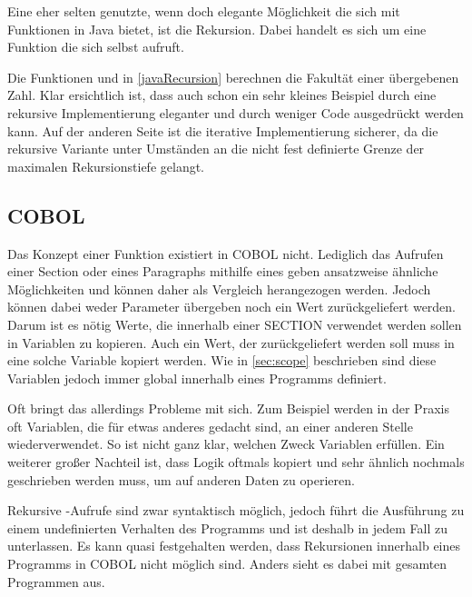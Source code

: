 Eine eher selten genutzte, wenn doch elegante Möglichkeit die sich mit Funktionen in Java bietet, ist die Rekursion. Dabei handelt es sich um eine Funktion die sich selbst aufruft. 


Die Funktionen  und  in \autoref{javaRecursion} berechnen  die Fakultät einer übergebenen Zahl. Klar ersichtlich ist, dass auch schon ein sehr kleines Beispiel durch eine rekursive Implementierung eleganter und durch weniger Code ausgedrückt werden kann. Auf der anderen Seite ist die iterative Implementierung sicherer, da die rekursive Variante unter Umständen an die nicht fest definierte Grenze der maximalen Rekursionstiefe gelangt.

\subsection*{COBOL}
Das Konzept einer Funktion existiert in COBOL nicht. Lediglich das Aufrufen einer Section oder eines Paragraphs mithilfe eines  geben ansatzweise ähnliche Möglichkeiten und können daher als Vergleich herangezogen werden. Jedoch können dabei weder Parameter übergeben noch ein Wert zurückgeliefert werden. Darum ist es nötig Werte, die innerhalb einer SECTION verwendet werden sollen in Variablen zu kopieren. Auch ein Wert, der zurückgeliefert werden soll muss in eine solche Variable kopiert werden. Wie in \autoref{sec:scope} beschrieben sind diese Variablen jedoch immer global innerhalb eines Programms definiert.

Oft bringt das allerdings Probleme mit sich. Zum Beispiel werden in der Praxis oft Variablen, die für etwas anderes gedacht sind, an einer anderen Stelle wiederverwendet. So ist nicht ganz klar, welchen Zweck Variablen erfüllen. Ein weiterer großer Nachteil ist, dass Logik oftmals kopiert und sehr ähnlich nochmals geschrieben werden muss, um auf anderen Daten zu operieren.

Rekursive -Aufrufe sind zwar syntaktisch möglich, jedoch führt die Ausführung zu einem undefinierten Verhalten des Programms und ist deshalb in jedem Fall zu unterlassen. Es kann quasi festgehalten werden, dass Rekursionen innerhalb eines Programms in COBOL nicht möglich sind. Anders sieht es dabei mit gesamten Programmen aus.


